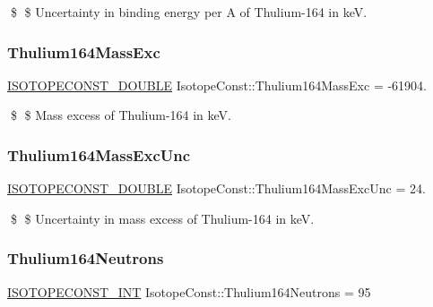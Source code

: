 \$ \$ Uncertainty in binding energy per A of Thulium-\/164 in keV. \mbox{\label{group___isotope_const-_thulium-_tm164_ga9ffe55eb26ca44a6581972a34c9cf1a9}} 
\subsubsection{\texorpdfstring{Thulium164\+Mass\+Exc}{Thulium164MassExc}}
{\footnotesize\ttfamily \mbox{\hyperlink{group___isotope_const-_macros_ga8f45a7272ce02c0b4c65c44636ed719a}{I\+S\+O\+T\+O\+P\+E\+C\+O\+N\+S\+T\+\_\+\+D\+O\+U\+B\+LE}} Isotope\+Const\+::\+Thulium164\+Mass\+Exc = -\/61904.}

\$ \$ Mass excess of Thulium-\/164 in keV. \mbox{\label{group___isotope_const-_thulium-_tm164_ga843efb62a38083b3fd5b4e1d98adceec}} 
\subsubsection{\texorpdfstring{Thulium164\+Mass\+Exc\+Unc}{Thulium164MassExcUnc}}
{\footnotesize\ttfamily \mbox{\hyperlink{group___isotope_const-_macros_ga8f45a7272ce02c0b4c65c44636ed719a}{I\+S\+O\+T\+O\+P\+E\+C\+O\+N\+S\+T\+\_\+\+D\+O\+U\+B\+LE}} Isotope\+Const\+::\+Thulium164\+Mass\+Exc\+Unc = 24.}

\$ \$ Uncertainty in mass excess of Thulium-\/164 in keV. \mbox{\label{group___isotope_const-_thulium-_tm164_ga48e6bad7d94e3d0765732bb5c53a71a4}} 
\subsubsection{\texorpdfstring{Thulium164\+Neutrons}{Thulium164Neutrons}}
{\footnotesize\ttfamily \mbox{\hyperlink{group___isotope_const-_macros_ga5f18360b3e99483a35c32d789e62621c}{I\+S\+O\+T\+O\+P\+E\+C\+O\+N\+S\+T\+\_\+\+I\+NT}} Isotope\+Const\+::\+Thulium164\+Neutrons = 95}


